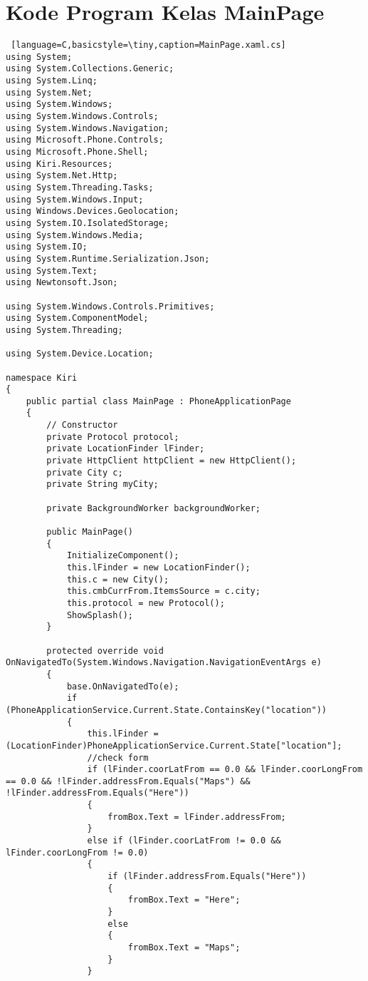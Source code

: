 \chapter{Kode Program Kelas MainPage}
\label{app:A}

\singlespacing 

\begin{lstlisting} [language=C,basicstyle=\tiny,caption=MainPage.xaml.cs]
using System;
using System.Collections.Generic;
using System.Linq;
using System.Net;
using System.Windows;
using System.Windows.Controls;
using System.Windows.Navigation;
using Microsoft.Phone.Controls;
using Microsoft.Phone.Shell;
using Kiri.Resources;
using System.Net.Http;
using System.Threading.Tasks;
using System.Windows.Input;
using Windows.Devices.Geolocation;
using System.IO.IsolatedStorage;
using System.Windows.Media;
using System.IO;
using System.Runtime.Serialization.Json;
using System.Text;
using Newtonsoft.Json;

using System.Windows.Controls.Primitives;
using System.ComponentModel;
using System.Threading;

using System.Device.Location; 

namespace Kiri
{
    public partial class MainPage : PhoneApplicationPage
    {
        // Constructor
        private Protocol protocol;
        private LocationFinder lFinder;
        private HttpClient httpClient = new HttpClient();
        private City c;
        private String myCity;

        private BackgroundWorker backgroundWorker;
        
        public MainPage()
        {
            InitializeComponent();
            this.lFinder = new LocationFinder();
            this.c = new City();
            this.cmbCurrFrom.ItemsSource = c.city;
            this.protocol = new Protocol();
            ShowSplash();
        }

        protected override void OnNavigatedTo(System.Windows.Navigation.NavigationEventArgs e)
        {
            base.OnNavigatedTo(e);
            if (PhoneApplicationService.Current.State.ContainsKey("location"))
            {
                this.lFinder = (LocationFinder)PhoneApplicationService.Current.State["location"];
                //check form
                if (lFinder.coorLatFrom == 0.0 && lFinder.coorLongFrom == 0.0 && !lFinder.addressFrom.Equals("Maps") && !lFinder.addressFrom.Equals("Here"))
                {
                    fromBox.Text = lFinder.addressFrom;
                }
                else if (lFinder.coorLatFrom != 0.0 && lFinder.coorLongFrom != 0.0)
                {
                    if (lFinder.addressFrom.Equals("Here"))
                    {
                        fromBox.Text = "Here";
                    }
                    else
                    {
                        fromBox.Text = "Maps";
                    }
                }


\end{lstlisting}

